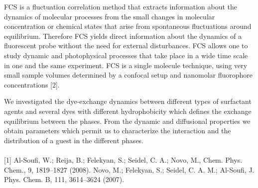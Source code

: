 FCS is a fluctuation correlation method that extracts information about the
dynamics of molecular processes from the small changes in molecular concentration
or chemical states that arise from spontaneous fluctuations around equilibrium.
Therefore FCS yields direct information about the dynamics of a fluorescent probe
without the need for external disturbances. FCS allows one to study dynamic and
photophysical processes that take place in a wide time scale in one and the same
experiment. FCS is a single molecule technique, using very small sample volumes
determined by a confocal setup and nanomolar fluorophore concentrations [2].

We investigated the dye-exchange dynamics between different types of
surfactant agents and several dyes with different hydrophobicity which defines the
exchange equilibrium between the phases. From the dynamic and diffusional
properties we obtain parameters which permit us to characterize the interaction and
the distribution of a guest in the different phases.
\\
\vspace{0.5cm}
\\
{\footnotesize
[1] Al-Soufi, W.; Reija, B.; Felekyan, S.; Seidel, C. A.; Novo, M., Chem. Phys. Chem., 9, 1819--1827
(2008).
\newline
[2] Novo, M.; Felekyan, S.; Seidel, C. A. M.; Al-Soufi, J. Phys. Chem. B, 111, 3614--3624 (2007).
}

